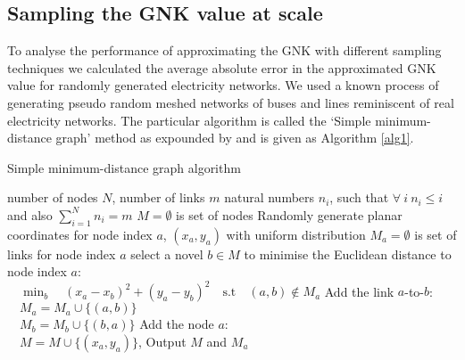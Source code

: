 \subsection{Sampling the GNK value at scale}\label{section:performance}

To analyse the performance of approximating the GNK with different sampling techniques we calculated the average absolute error in the approximated GNK value for randomly generated electricity networks.
We used a known process of generating pseudo random meshed networks of buses and lines reminiscent of real electricity networks. The particular algorithm is called the `Simple minimum-distance graph' method as expounded by \cite{hines1} and is given as Algorithm \ref{alg1}.

\begin{algorithm}[]
\caption{Simple minimum-distance graph algorithm}
\label{alg1}
\begin{algorithmic}
    \REQUIRE number of nodes $N$, number of links $m$
    \REQUIRE natural numbers $n_i$, such that $\forall~i~n_i\leq i$ and also $\sum_{i=1}^Nn_i=m$
    \STATE $M=\emptyset$ is set of nodes
        \STATE Randomly generate planar coordinates for node index $a$, $(x_a ,y_a)$ with uniform distribution
        \STATE $M_a=\emptyset$ is set of links for node index $a$
            \STATE select a novel $b\in M$ to minimise the Euclidean distance to node index $a$:\\ $\quad\min_b\quad (x_a-x_b)^2+(y_a-y_b)^2\quad\text{s.t}\quad (a, b)\notin M_a$
            \STATE Add the link $a$-to-$b$:\\ $\quad M_a=M_a\cup \{(a, b)\}$\\ $\quad M_b=M_b\cup \{(b, a)\}$
        \ENDFOR
        \STATE Add the node $a$:\\ $\quad M=M\cup \{(x_a ,y_a)\}$, 
    \ENDFOR
    \STATE Output $M$ and $M_a$ 
\end{algorithmic}
\end{algorithm}


\DIFaddbegin \iffigures

\fi

